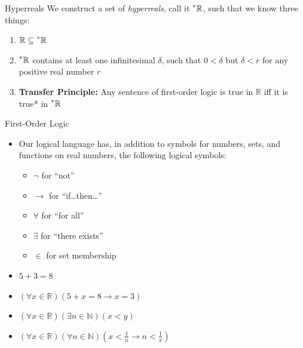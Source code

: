 \documentclass{beamer}
\theoremstyle{plain}
\theoremstyle{definition}
\newcommand{\reals}{\mathbb{R}}
\newcommand{\hreals}{\prescript{*}{}{\mathbb{R}}}
\newcommand{\nats}{\mathbb{N}}
\begin{document}
\begin{frame}{Hyperreals} 
We construct a set of \textit{hyperreals}, call it $\hreals$, such that we know three things: \vspace{4pt}
\begin{enumerate} \itemsep = 6pt
	\item $\reals \subseteq \hreals$
	\item $\hreals$ contains at least one infinitesimal $\delta$, such that $0 < \delta$ but $\delta < r$ for any positive real number $r$
	\item \textbf{Transfer Principle:} Any sentence of first-order logic is true in $\reals$ iff it is true* in $\hreals$
\end{enumerate}
\end{frame}

\begin{frame}{First-Order Logic}
\begin{itemize} \itemsep = 6pt
	\item Our logical language has, in addition to symbols for numbers, sets, and functions on real numbers, the following logical symbols:
	\begin{itemize}
		\item $\neg$ for ``not''
		\item $\to$ for ``if\ldots then\ldots''
		\item $\forall$ for ``for all''
		\item $\exists$ for ``there exists''
		\item $\in$ for set membership
	\end{itemize} 
	\item $5 + 3 = 8$
	\item $(\forall x \in \reals)(5 + x = 8 \to x = 3)$
	\item $(\forall x \in \reals)(\exists n \in \nats)(x < y)$
	\item $(\forall x \in \reals)(\forall n \in \nats)(x < \frac{1}{n} \to n < \frac{1}{x})$
\end{itemize}
\end{frame}
\end{document}
